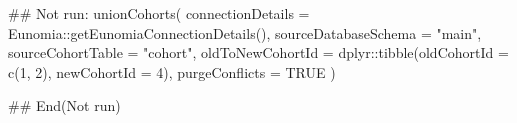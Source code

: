 \documentclass[a4paper]{book}
\begin{document}
%
\begin{Examples}
\begin{ExampleCode}
## Not run: 
unionCohorts(
  connectionDetails = Eunomia::getEunomiaConnectionDetails(),
  sourceDatabaseSchema = "main",
  sourceCohortTable = "cohort",
  oldToNewCohortId = dplyr::tibble(oldCohortId = c(1, 2), newCohortId = 4),
  purgeConflicts = TRUE
)

## End(Not run)

\end{ExampleCode}
\end{Examples}
\printindex{}
\end{document}
